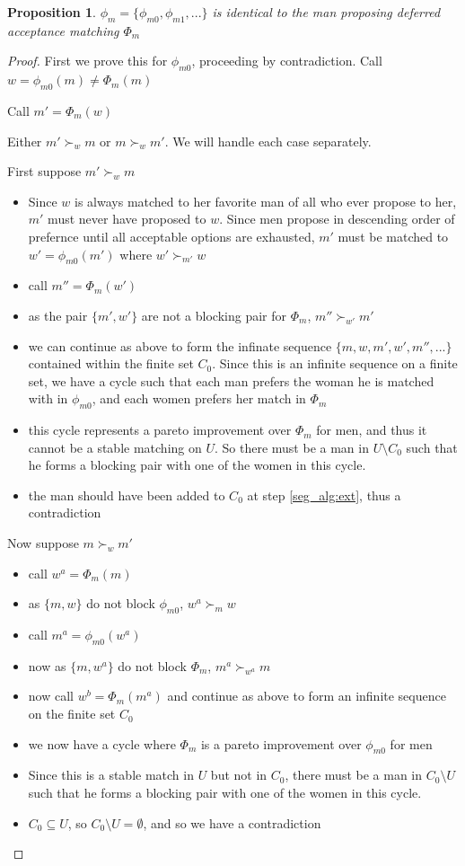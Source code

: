 \documentclass[WP]{AEA}
\newtheorem{prop}{Proposition}
\begin{document}
\begin{prop} \label{prop:equiv}
	$\phi_m = \{\phi_{m0}, \phi_{m1}, ...\}$ is identical to the man proposing deferred acceptance matching $\Phi_m $
\end{prop}
\begin{proof}
	First we prove this for $\phi_{m0}$, proceeding by contradiction.  Call $w = \phi_{m0}(m) \neq \Phi_m(m)$
	
	Call $m' = \Phi_m(w)$
	
	Either $m'\succ_w m$ or $m \succ_w m'$. We will handle each case separately.
	
	First suppose $m'\succ_w m$
	\begin{itemize}
		\item Since $w$ is always matched to her favorite man of all who ever propose to her, $m'$ must never have proposed to $w$. Since men propose in descending order of prefernce until all acceptable options are exhausted, $m'$ must be matched to $w' = \phi_{m0}(m')$ where $w' \succ_{m'} w$
		\item call $m'' = \Phi_m (w')$
		\item as the pair $\{m', w'\}$ are not a blocking pair for $\Phi_m$, $m'' \succ_{w'} m'$
		\item we can continue as above to form the infinate sequence $\{m,w,m',w',m'',...\}$ contained within the finite set $C_0$. Since this is an infinite sequence on a finite set, we have a cycle such that each man prefers the woman he is matched with in  $\phi_{m0}$, and each women prefers her match in $\Phi_m$
		\item this cycle represents a pareto improvement over  $\Phi_m$ for men, and thus it cannot be a stable matching on $U$.  So there must be a man in $U \setminus C_0$ such that he forms a blocking pair with one of the women in this cycle. 
		\item the man should have been added to $C_0$ at step \ref*{seg_alg:ext}, thus a contradiction
	\end{itemize}
	Now suppose  $m \succ_w m'$
	\begin{itemize}
		\item call $w^a = \Phi_m(m)$
		\item as $\{m,w\}$ do not block $\phi_{m0}$, $w^a \succ_{m} w$
		\item call $m^a = \phi_{m0}(w^a)$
		\item now as $\{m,w^a\}$ do not block $\Phi_m$, $m^a \succ_{w^a} m $
		\item now call $w^b=\Phi_m(m^a)$ and continue as above to form an infinite sequence on the finite set $C_0$
		\item we now have a cycle where $\Phi_m$ is a pareto improvement over $\phi_{m0}$ for men
		\item Since this is a stable match in $U$ but not in $C_0$,  there must be a man in $C_0 \setminus U $ such that he forms a blocking pair with one of the women in this cycle.
		\item $C_0 \subseteq U$, so $C_0 \setminus U  = \emptyset$, and so we have a contradiction
		

\end{itemize}
\end{proof}
\end{document}
